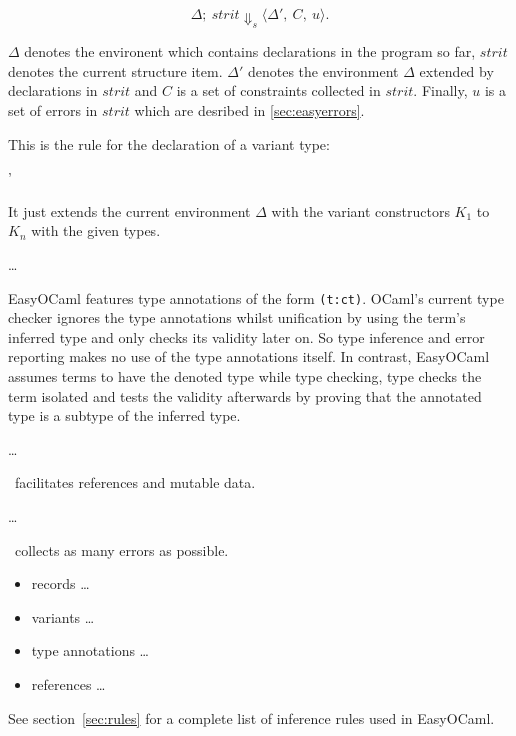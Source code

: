 \[ \Delta;\ strit \Downarrow_s \langle \Delta',\ C,\ u\rangle.\]

$\Delta$ denotes the environent which contains declarations in the program so
far, $strit$ denotes the current structure item. $\Delta'$ denotes the
environment $\Delta$ extended by declarations in $strit$ and $C$ is a set of
constraints collected in $strit$. Finally, $u$ is a set of errors in $strit$
which are desribed in \ref{sec:easyerrors}.

This is the rule for the declaration of a variant type:

\centerline{
{\styjudge {} {\Delta'} \emptyset \emptyset}}

It just extends the current environment $\Delta$ with the variant constructors
$K_1$ to $K_n$ with the given types.

\dots

EasyOCaml features type annotations of the form \texttt{(t:ct)}. OCaml's
current type checker ignores the type annotations whilst unification by using
the term's inferred type and only checks its validity later on.
So type inference and error reporting makes no use of the type annotations
itself.
In contrast, EasyOCaml assumes terms to have the denoted type while type
checking, type checks the term isolated and tests the validity afterwards by
proving that the annotated type is a subtype of the inferred type.

\dots

\easyocaml\ facilitates references and mutable data.

\dots

\easyocaml\ collects as many errors as possible.

\begin{itemize}
    \item records \ldots{}
    \item variants \ldots{}
    \item type annotations \ldots{}
    \item references \ldots{}
\end{itemize}

See section~\ref{sec:rules} for a complete list of inference rules used in
EasyOCaml.
